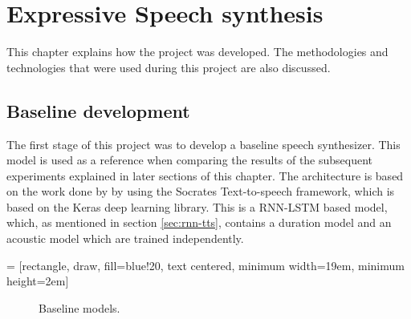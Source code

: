 \chapter{Expressive Speech synthesis}


This chapter explains how the project was developed. The methodologies and technologies that were used during this project are also discussed.

\section{Baseline development}

The first stage of this project was to develop a baseline speech synthesizer. This model is used as a reference when comparing the results of the subsequent experiments explained in later sections of this chapter. The architecture is based on the work done by \cite{pascual2006deep} by using the Socrates Text-to-speech framework, which is based on the Keras deep learning library. This is a RNN-LSTM based model, which, as mentioned in section \ref{sec:rnn-tts}, contains a duration model and an acoustic model which are trained independently.

 = [rectangle, draw, fill=blue!20, text centered, minimum width=19em, minimum height=2em]

\begin{figure}[h]
    \centering
    \caption{Baseline models.}
    \label{fig:lstm-tts}
\end{figure}

